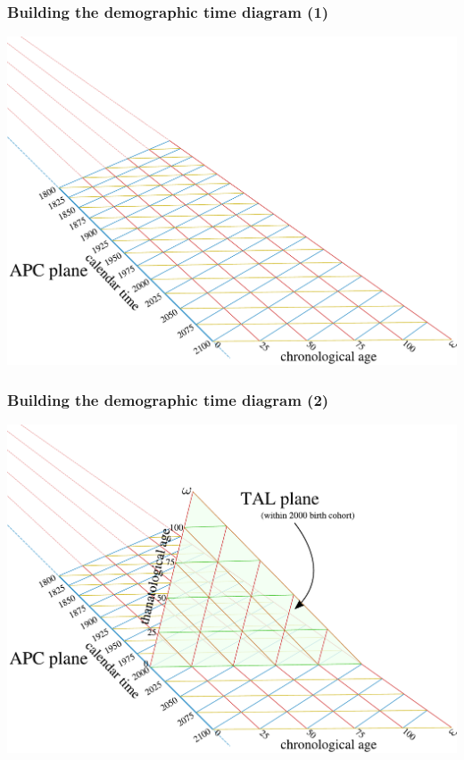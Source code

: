 \documentclass[20pt]{beamer}
\begin{document}
\begin{frame}
\frametitle{Building the demographic time diagram (1)}
\vspace{-1em}
\begin{center}
\includegraphics[scale=.8]{Figures/buildTAL1.pdf}
\end{center}
\end{frame}
\begin{frame}
\frametitle{Building the demographic time diagram (2)}
\vspace{-1em}
\begin{center}
\includegraphics[scale=.8]{Figures/buildTAL2.pdf}
\end{center}
\end{frame}
\end{document}

